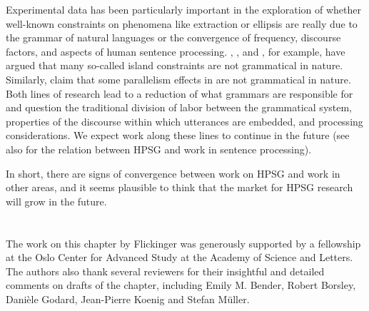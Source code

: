 \documentclass[output=paper
 	        ,biblatex
                ,babelshorthands
                ,newtxmath
                ,draftmode
                ,colorlinks, citecolor=brown
]{langscibook}
\begin{document}
Experimental data has been particularly important in the exploration of whether well-known
constraints on phenomena like extraction or ellipsis are really due to the grammar of natural
languages or the convergence of frequency, discourse factors, and aspects of human sentence
processing. \citet{HS2010a-u}, \citet{CD2019a-u}, and \citet{CP2020a-u}, for
example, have argued that many so-called island constraints are not grammatical in
nature. Similarly, \citet{SAHM2019a-u} claim that some parallelism
effects in  are not grammatical in nature. Both lines of research lead to a
reduction of what grammars are responsible for and question the traditional division of labor
between the grammatical system, properties of the discourse within which utterances are embedded,
and processing considerations. We expect work along these lines to continue in the future (see also
 for the relation between HPSG and work in sentence processing).
 
In short, there are signs of convergence between work on HPSG and work in other areas, and it seems
plausible to think that the market for HPSG research will grow in the future.

\section*{\acknowledgmentsUS}

The work on this chapter by Flickinger was generously supported by a fellowship at the Oslo Center for Advanced Study at the  Academy of Science and Letters.  The authors also thank several reviewers for their insightful and detailed comments on drafts of the chapter, including Emily M. Bender, Robert Borsley, Danièle Godard, Jean-Pierre Koenig and Stefan Müller.


{\sloppy
\printbibliography[heading=subbibliography,notkeyword=this]
}
\end{document}
